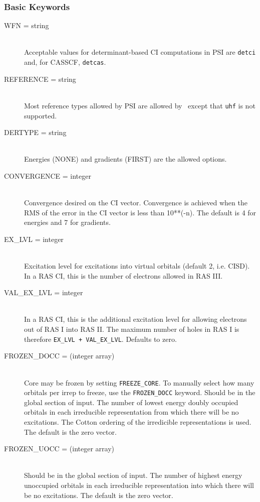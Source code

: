 \subsubsection{Basic Keywords}
\begin{description}
\item[WFN = string]\mbox{}\\
Acceptable values for determinant-based CI computations in PSI
are {\tt detci} and, for CASSCF, {\tt detcas}.
\item[REFERENCE = string]\mbox{}\\
Most reference types allowed by PSI are allowed by \PSIdetci\,
except that {\tt uhf} is not supported.
\item[DERTYPE = string]\mbox{}\\
Energies (NONE) and gradients (FIRST) are the allowed options.
\item[CONVERGENCE = integer]\mbox{}\\
Convergence desired on the CI vector.  Convergence is achieved when the
RMS of the error in the CI vector is less than 10**(-n).  The default is 4
for energies and 7 for gradients.
\item[EX\_LVL = integer]\mbox{}\\
Excitation level for excitations into virtual
orbitals (default 2, i.e. CISD).  In a RAS CI, this is the number
of electrons allowed in RAS III.
\item[VAL\_EX\_LVL = integer]\mbox{}\\
In a RAS CI, this is the additional excitation level for allowing
electrons out of RAS I into RAS II.  The maximum number of holes in RAS I
is therefore {\tt EX\_LVL + VAL\_EX\_LVL}.  Defaults to zero.
\item[FROZEN\_DOCC = (integer array)]\mbox{}\\
Core may be frozen by setting {\tt FREEZE\_CORE}.  To
manually select how many orbitals per irrep to freeze, use the
{\tt FROZEN\_DOCC} keyword.
Should be in the global section of input.
The number of lowest energy doubly occupied orbitals in each irreducible
representation from which there will be no excitations.
The Cotton ordering of the irredicible representations is used.
The default is the zero vector.
\item[FROZEN\_UOCC = (integer array)]\mbox{}\\
Should be in the global section of input.
The number of highest energy unoccupied orbitals in each irreducible
representation into which there will be no excitations.
The default is the zero vector.

\end{description}

